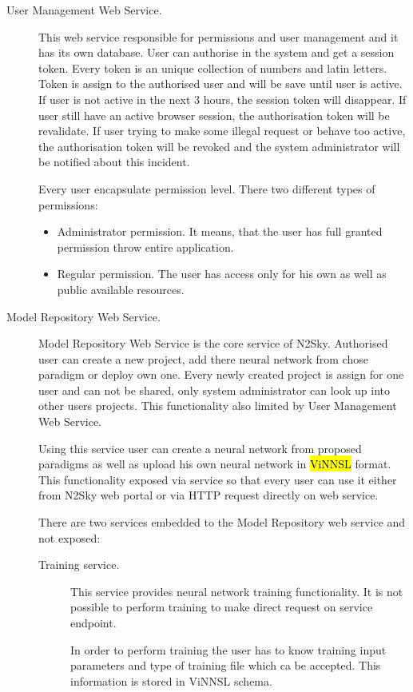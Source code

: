 \begin{description}
\item[User Management Web Service.]   This web service responsible for permissions and user management and it has its own database. User can authorise in the system and get a session token. Every token is an unique collection of numbers and latin letters. Token is assign to the authorised user and will be save until user is active. If user is not active in the next 3 hours, the session token will disappear. If user still have an active browser session, the authorisation token will be revalidate. If user trying to make some illegal request or behave too active, the authorisation token will be revoked and the system administrator will be notified about this incident. 

Every user encapsulate permission level. There two different types of permissions:
\begin{itemize}
\item Administrator permission. It means, that the user has full granted permission throw entire application.
\item Regular permission. The user has access only for his own as well as public available resources.  
\end{itemize}
\item[Model Repository Web Service.]  Model Repository Web Service is the core service of N2Sky. Authorised user can create a new project, add there neural network from chose paradigm or deploy own one. Every newly created project is assign for one user and can not be shared, only system administrator can look up into other users projects. This functionality also limited by User Management Web Service. 

Using this service user can create a neural network from proposed paradigms as well as upload his own neural network in \hl{ViNNSL} format. This functionality exposed via service so that every user can use it either from N2Sky web portal or via HTTP request directly on web service.

There are two services embedded to the Model Repository web service and not exposed:

\begin{description}
\item[Training service.]  This service provides neural network training functionality. It is not possible to perform training to make direct request on service endpoint. 

In order  to perform training the user has to know training input parameters and type of training file which ca be accepted. This information is stored in ViNNSL schema. 
 

\end{description}
\end{description}
